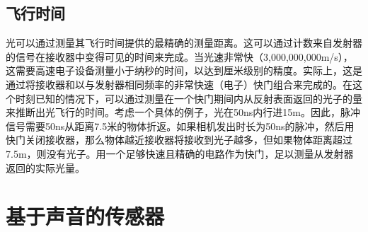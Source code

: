 \subsection{飞行时间}

光可以通过测量其飞行时间提供的最精确的测量距离。这可以通过计数来自发射器的信号在接收器中变得可见的时间来完成。当光速非常快（3,000,000,000m/s），这需要高速电子设备测量小于纳秒的时间，以达到厘米级别的精度。实际上，这是通过将接收器和以与发射器相同频率的非常快速（电子）快门组合来完成的。在这个时刻已知的情况下，可以通过测量在一个快门期间内从反射表面返回的光子的量来推断出光飞行的时间。考虑一个具体的例子，光在50ns内行进15m。因此，脉冲信号需要50ns从距离7.5米的物体折返。如果相机发出时长为50ns的脉冲，然后用快门关闭接收器，那么物体越近接收器将接收到光子越多，但如果物体距离超过7.5m，则没有光​​子。用一个足够快速且精确的电路作为快门，足以测量从发射器返回的实际光量。


\section{基于声音的传感器}

